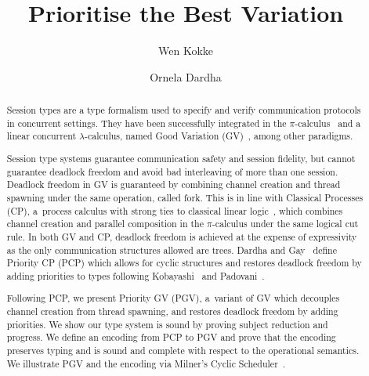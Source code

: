 \documentclass[citecolor=red,linkcolor=blue,runningheads]{llncs}
\newcommand{\onlyinsubfile}[1]{#1}
\newcommand{\notinsubfile}[1]{}
\begin{document}
%
\renewcommand{\onlyinsubfile}[1]{}
\renewcommand{\notinsubfile}[1]{#1}
%
\title{Prioritise the Best Variation%
}
%
\author{
  Wen Kokke%
  \and%
  Ornela Dardha%
  }
%
%
%
\maketitle
%
\begin{abstract}
Session types are a type formalism used to specify and verify communication protocols in concurrent settings. They have been successfully integrated in the $\pi$-calculus~\cite{honda93,takeuchihonda94,hondavasconcelos98} and a linear concurrent $\lambda$-calculus, named Good Variation (GV)~\cite{wadler15,lindleymorris15}, among other paradigms.

Session type systems guarantee communication safety and session fidelity, but cannot guarantee deadlock freedom and avoid bad interleaving of more than one session. Deadlock freedom in GV is guaranteed by combining channel creation and thread spawning under the same operation, called fork. This is in line with Classical Processes (CP), a~process calculus with strong ties to classical linear logic~\cite{wadler12}, which combines channel creation and parallel composition in the $\pi$-calculus under the same logical cut rule. In both GV and CP, deadlock freedom is achieved at the expense of expressivity as the only communication structures allowed are trees. Dardha and Gay~\cite{dardhagay18} define Priority CP (PCP) which allows for cyclic structures and restores deadlock freedom by adding priorities to types following Kobayashi~\cite{kobayashi06} and Padovani~\cite{padovani14}.

Following PCP, we present Priority GV (PGV), a~variant of GV which decouples channel creation from thread spawning, and restores deadlock freedom by adding priorities. We show our type system is sound by proving subject reduction and progress. We define an encoding from PCP to PGV and prove that the encoding preserves typing and is sound and complete with respect to the operational semantics. We illustrate PGV and the encoding via Milner's Cyclic Scheduler~\cite{milner89}.
\end{abstract}






\clearpage



\clearpage
\appendix
\changetext{}{10em}{-5em}{-5em}{}

\end{document}
